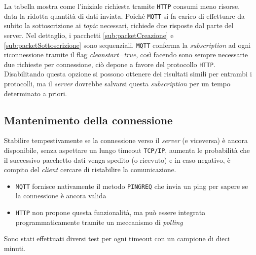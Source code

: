 La tabella mostra come l'iniziale richiesta tramite \verb+HTTP+ consumi meno risorse, data la ridotta quantità di dati inviata.
Poiché \verb+MQTT+ si fa carico di effettuare da subito la sottoscrizione ai \textit{topic} necessari, richiede due risposte dal parte del server.
Nel dettaglio, i pacchetti \ref{sub:packetCreazione} e \ref{sub:packetSottoscrizione} sono sequenziali.
\verb+MQTT+ conferma la \textit{subscription} ad ogni riconnessione tramite il flag \textit{cleanstart=true}, così facendo sono sempre necessarie due richieste per connessione, ciò depone a favore del protocollo \verb+HTTP+.
Disabilitando questa opzione si possono ottenere dei risultati simili per entrambi i protocolli, ma il \textit{server} dovrebbe salvarsi questa \textit{subscription} per un tempo determinato a priori.

\subsection{Mantenimento della connessione}
\label{sub:comparisonMantenimento}

Stabilire tempestivamente se la connessione verso il \textit{server} (e viceversa) è ancora disponibile, senza aspettare un lungo timeout \verb+TCP/IP+, aumenta le probabilità che il successivo pacchetto dati venga spedito (o ricevuto) e in caso negativo, è compito del \textit{client} cercare di ristabilire la comunicazione.

\begin{itemize}
\item \verb+MQTT+ fornisce nativamente il metodo \verb+PINGREQ+ che invia un ping per sapere se la connessione è ancora valida
\item \verb+HTTP+ non propone questa funzionalità, ma può essere integrata programmaticamente tramite un meccanismo di \textit{polling}
\end{itemize}

Sono stati effettuati diversi test per ogni timeout con un campione di dieci minuti.

